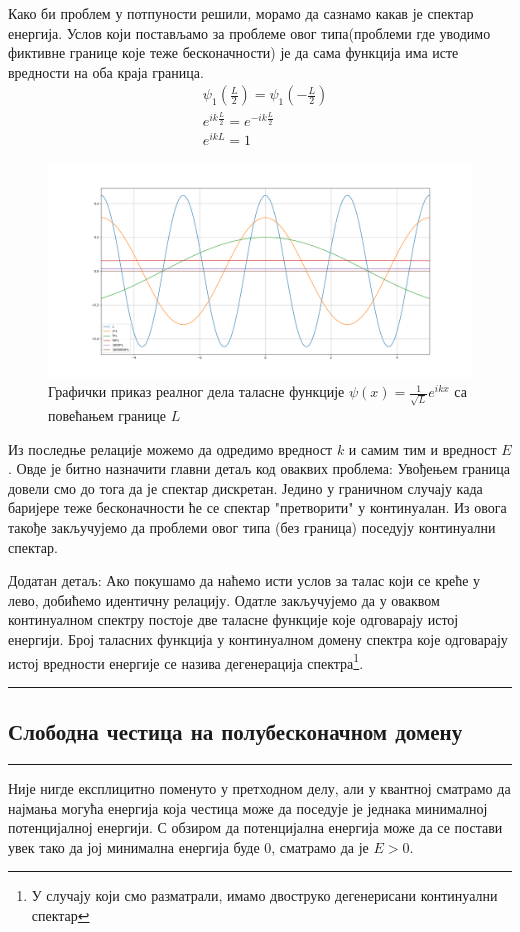 \documentclass{tufte-handout} %
\theoremstyle{definition}
\theoremstyle{remark}
\begin{document}
Како би проблем у потпуности решили, морамо да сазнамо какав је спектар енергија. Услов који постављамо за проблеме овог типа(проблеми где уводимо фиктивне границе које теже бесконачности) је да сама функција има исте вредности на оба краја граница.
\begin{align*}
	&\psi_1\left(\frac{L}{2}\right)=\psi_1\left(-\frac{L}{2}\right)\\
	&e^{ik\frac{L}{2}}=e^{-ik\frac{L}{2}}\\
	&e^{ikL}=1
\end{align*}
\begin{figure}[h!]
	\centering
	\includegraphics[width=1\textwidth]{grafik_kosinus.png}
	\caption{Графички приказ реалног дела таласне функције $\psi(x)=\frac{1}{\sqrt{L}}e^{ikx}$ са повећањем границе $L$}
\end{figure}
Из последње релације можемо да одредимо вредност $k$ и самим тим и вредност $E$. Овде је битно назначити главни детаљ код оваквих проблема: Увођењем граница довели смо до тога да је спектар дискретан. Једино у граничном случају када баријере теже бесконачности ће се спектар "претворити" у континуалан. Из овога такође закључујемо да проблеми овог типа (без граница) поседују континуални спектар.\par
Додатан детаљ: Ако покушамо да наћемо исти услов за талас који се креће у лево, добићемо идентичну релацију. Одатле закључујемо да у оваквом континуалном спектру постоје две таласне функције које одговарају истој енергији. Број таласних функција у континуалном домену спектра које одговарају истој вредности енергије се назива дегенерација спектра\footnote{У случају који смо разматрали, имамо двоструко дегенерисани континуални спектар}.
\vspace{3em}
\hrule
\subsection*{Слободна честица на полубесконачном домену}
\hrule
\vspace{1em}
Није нигде експлицитно поменуто у претходном делу, али у квантној сматрамо да најмања могућа енергија која честица може да поседује је једнака минималној потенцијалној енергији. С обзиром да потенцијална енергија може да се постави увек тако да јој минимална енергија буде 0, сматрамо да је $E>0$.\par
\end{document}
